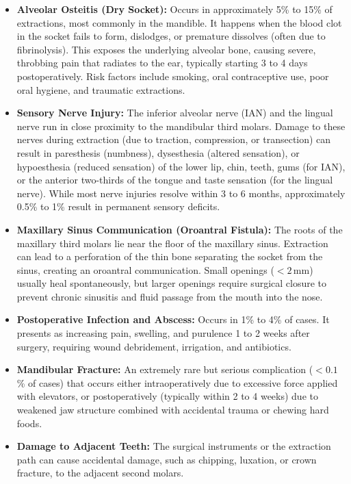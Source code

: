 \begin{itemize}
    \item \textbf{Alveolar Osteitis (Dry Socket):} Occurs in approximately 5\% to 15\% of extractions, most commonly in the mandible. It happens when the blood clot in the socket fails to form, dislodges, or premature dissolves (often due to fibrinolysis). This exposes the underlying alveolar bone, causing severe, throbbing pain that radiates to the ear, typically starting 3 to 4 days postoperatively. Risk factors include smoking, oral contraceptive use, poor oral hygiene, and traumatic extractions.
    \item \textbf{Sensory Nerve Injury:} The inferior alveolar nerve (IAN) and the lingual nerve run in close proximity to the mandibular third molars. Damage to these nerves during extraction (due to traction, compression, or transection) can result in paresthesis (numbness), dysesthesia (altered sensation), or hypoesthesia (reduced sensation) of the lower lip, chin, teeth, gums (for IAN), or the anterior two-thirds of the tongue and taste sensation (for the lingual nerve). While most nerve injuries resolve within 3 to 6 months, approximately 0.5\% to 1\% result in permanent sensory deficits.
    \item \textbf{Maxillary Sinus Communication (Oroantral Fistula):} The roots of the maxillary third molars lie near the floor of the maxillary sinus. Extraction can lead to a perforation of the thin bone separating the socket from the sinus, creating an oroantral communication. Small openings ($<2$\,mm) usually heal spontaneously, but larger openings require surgical closure to prevent chronic sinusitis and fluid passage from the mouth into the nose.
    \item \textbf{Postoperative Infection and Abscess:} Occurs in 1\% to 4\% of cases. It presents as increasing pain, swelling, and purulence 1 to 2 weeks after surgery, requiring wound debridement, irrigation, and antibiotics.
    \item \textbf{Mandibular Fracture:} An extremely rare but serious complication ($<0.1$\% of cases) that occurs either intraoperatively due to excessive force applied with elevators, or postoperatively (typically within 2 to 4 weeks) due to weakened jaw structure combined with accidental trauma or chewing hard foods.
    \item \textbf{Damage to Adjacent Teeth:} The surgical instruments or the extraction path can cause accidental damage, such as chipping, luxation, or crown fracture, to the adjacent second molars.
\end{itemize}

